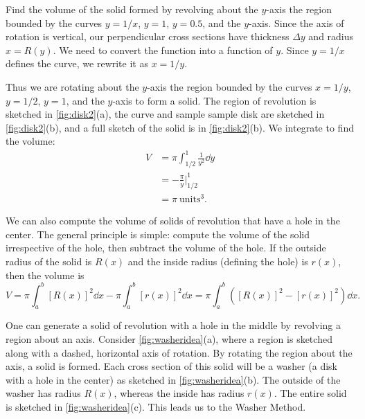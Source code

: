 \begin{example}\label{ex_disk2}%
Find the volume of the solid formed by revolving about the $y$-axis the region bounded by the curves $y=1/x$, $y=1$, $y=0.5$, and the $y$-axis.
\solution
Since the axis of rotation is vertical, our perpendicular cross sections have thickness $\Delta y$ and radius $x=R(y)$. We need to convert the function into a function of $y$. %
Since $y=1/x$ defines the curve, we rewrite it as $x=1/y$.%

Thus we are rotating about the $y$-axis the region bounded by the curves $x=1/y$, $y=1/2$, $y=1$, and the $y$-axis to form a solid. The region of revolution is sketched in \autoref{fig:disk2}(a), the curve and sample sample disk are sketched in \autoref{fig:disk2}(b), and a full sketch of the solid is in \autoref{fig:disk2}(b). We integrate to find the volume:
\begin{align*}
	V &= \pi\int_{1/2}^1 \frac{1}{y^2}\dd y \\
	&= -\frac{\pi}y\Big|_{1/2}^1 \\
	&= \pi\ \text{units}^3.
\end{align*}
\end{example}



We can also compute the volume of solids of revolution that have a hole in the center. The general principle is simple: compute the volume of the solid irrespective of the hole, then subtract the volume of the hole. If the outside radius of the solid is $R(x)$ and the inside radius (defining the hole) is $r(x)$, then the volume is 
\[
V = \pi\int_a^b [R(x)]^2 \dd x - \pi\int_a^b [r(x)]^2\dd x
= \pi\int_a^b \left([R(x)]^2-[r(x)]^2\right)\dd x.
\]

One can generate a solid of revolution with a hole in the middle by revolving a region about an axis. Consider \autoref{fig:washeridea}(a), where a region is sketched along with a dashed, horizontal axis of rotation. By rotating the region about the axis, a solid is formed. Each cross section of this solid will be a washer (a disk with a hole in the center) as sketched in \autoref{fig:washeridea}(b). The outside of the washer has radius $R(x)$, whereas the inside has radius $r(x)$. The entire solid is sketched in \autoref{fig:washeridea}(c).  This leads us to the Washer Method.

